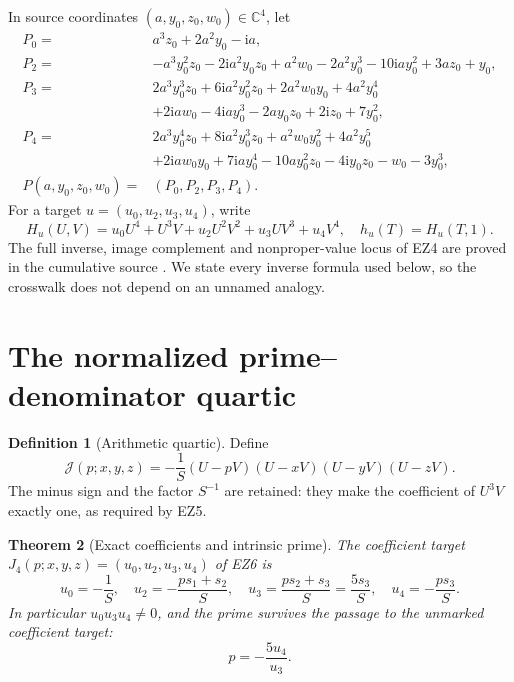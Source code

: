 \documentclass[11pt]{article}
\newtheorem{theorem}{Theorem}[section]
\theoremstyle{definition}\newtheorem{definition}[theorem]{Definition}
\theoremstyle{remark}\newtheorem{remark}[theorem]{Remark}
\newcommand{\C}{\mathbb C}
\newcommand{\ii}{\mathrm i}
\begin{document}
In source coordinates \((a,y_0,z_0,w_0)\in\C^4\), let
\begin{align}
 P_0={}&a^3z_0+2a^2y_0-\ii a,\nonumber\\
 P_2={}&-a^3y_0^2z_0-2\ii a^2y_0z_0+a^2w_0-2a^2y_0^3
       -10\ii ay_0^2+3az_0+y_0,\nonumber\\
 P_3={}&2a^3y_0^3z_0+6\ii a^2y_0^2z_0+2a^2w_0y_0+4a^2y_0^4\nonumber\\
      &+2\ii aw_0-4\ii ay_0^3-2ay_0z_0+2\ii z_0+7y_0^2,
       \nonumber\\
 P_4={}&2a^3y_0^4z_0+8\ii a^2y_0^3z_0+a^2w_0y_0^2+4a^2y_0^5\nonumber\\
      &+2\ii aw_0y_0+7\ii ay_0^4-10ay_0^2z_0
       -4\ii y_0z_0-w_0-3y_0^3,                       \tag{EZ4}\\
 P(a,y_0,z_0,w_0)={}&(P_0,P_2,P_3,P_4).\nonumber
\end{align}
For a target \(u=(u_0,u_2,u_3,u_4)\), write
\begin{equation}
 H_u(U,V)=u_0U^4+U^3V+u_2U^2V^2+u_3UV^3+u_4V^4,
 \quad h_u(T)=H_u(T,1).                                \tag{EZ5}
\end{equation}
The full inverse, image complement and nonproper-value locus of EZ4 are proved
in the cumulative source \cite[GF1--GF18]{SignedCover}.  We state every inverse
formula used below, so the crosswalk does not depend on an unnamed analogy.

\section{The normalized prime--denominator quartic}

\begin{definition}[Arithmetic quartic]
Define
\begin{equation}
 \mathcal J(p;x,y,z)=
 -\frac1S(U-pV)(U-xV)(U-yV)(U-zV).                     \tag{EZ6}
\end{equation}
The minus sign and the factor \(S^{-1}\) are retained: they make the
coefficient of \(U^3V\) exactly one, as required by EZ5.
\end{definition}

\begin{theorem}[Exact coefficients and intrinsic prime]
The coefficient target \(J_4(p;x,y,z)=(u_0,u_2,u_3,u_4)\) of EZ6 is
\begin{equation}
 \boxed{
 u_0=-\frac1S,\quad
 u_2=-\frac{ps_1+s_2}{S},\quad
 u_3=\frac{ps_2+s_3}{S}=\frac{5s_3}{S},\quad
 u_4=-\frac{ps_3}{S}.}                                 \tag{EZ7}
\end{equation}
In particular \(u_0u_3u_4\ne0\), and the prime survives the passage to
the unmarked coefficient target:
\begin{equation}
 \boxed{p=-\frac{5u_4}{u_3}.}                           \tag{EZ8}
\end{equation}
\end{theorem}
\end{document}
